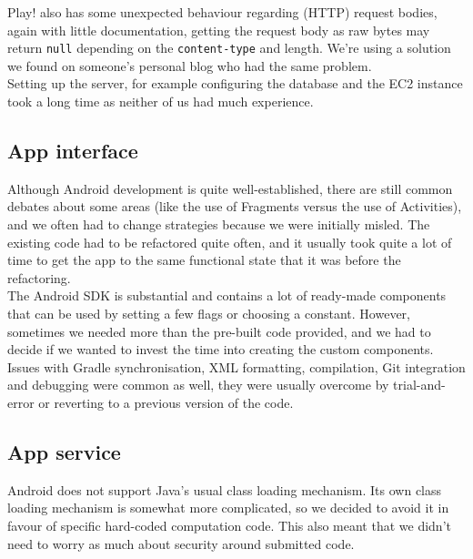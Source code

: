 \documentclass[a4paper,10pt]{article}
\begin{document}
Play! also has some unexpected behaviour regarding (HTTP) request bodies, again with little documentation, getting the
request body as raw bytes may return \texttt{null} depending on the \texttt{content-type} and length.
We're using a solution we found on someone's personal blog who had the same problem.\\

Setting up the server, for example configuring the database and the EC2 instance took a long time
as neither of us had much experience.

\subsection{App interface}
Although Android development is quite well-established, there are still common debates about some areas (like the use of Fragments versus the use of Activities), and we often had to change strategies because we were initially misled. The existing code had to be refactored quite often, and it usually took quite a lot of time to get the app to the same functional state that it was before the refactoring. \\

The Android SDK is substantial and contains a lot of ready-made components that can be used by setting a few flags or choosing a constant. However, sometimes we needed more than the pre-built code provided, and we had to decide if we wanted to invest the time into creating the custom components.\\

Issues with Gradle synchronisation, XML formatting, compilation, Git integration and debugging were common as well, they were usually overcome by trial-and-error or reverting to a previous version of the code.

\subsection{App service}

Android does not support Java's usual class loading mechanism. Its own class loading mechanism is somewhat more complicated, so we decided to avoid it in favour of specific hard-coded computation code. This also meant that we didn't need to worry as much about security around submitted code.

\end{document}
